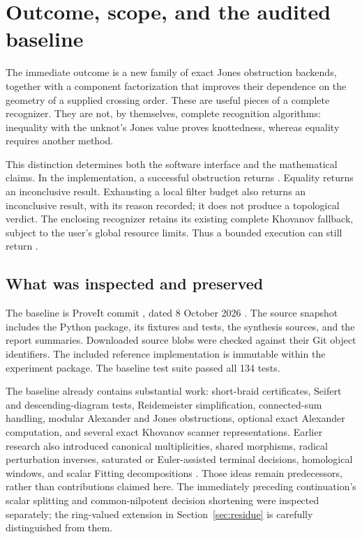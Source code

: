 \section{Outcome, scope, and the audited baseline}\label{sec:scope}

The immediate outcome is a new family of exact Jones obstruction backends,
together with a component factorization that improves their dependence on
the geometry of a supplied crossing order. These are useful pieces of a
complete recognizer. They are not, by themselves, complete recognition
algorithms: inequality with the unknot's Jones value proves knottedness,
whereas equality requires another method.

This distinction determines both the software interface and the mathematical
claims. In the implementation, a successful obstruction returns
. Equality returns an inconclusive result. Exhausting a local
filter budget also returns an inconclusive result, with its reason recorded;
it does not produce a topological verdict. The enclosing recognizer retains
its existing complete Khovanov fallback, subject to the user's global resource
limits. Thus a bounded execution can still return .

\subsection{What was inspected and preserved}

The baseline is ProveIt commit
, dated
8 October 2026 \cite{proveit2026}. The source snapshot includes the Python
 package, its fixtures and tests, the synthesis sources, and
the report summaries. Downloaded source blobs were checked against their
Git object identifiers. The included reference implementation is immutable
within the experiment package. The baseline test suite passed all 134 tests.

The baseline already contains substantial work: short-braid certificates,
Seifert and descending-diagram tests, Reidemeister simplification,
connected-sum handling, modular Alexander and Jones obstructions,
optional exact Alexander computation, and several exact Khovanov scanner
representations. Earlier research also introduced canonical multiplicities,
shared morphisms, radical perturbation inverses, saturated or Euler-assisted
terminal decisions, homological windows, and scalar Fitting decompositions
\cite{report07,report08,report09,report10,report11,report12}.
Those ideas remain predecessors, rather than contributions claimed here.
The immediately preceding continuation's scalar splitting and
common-nilpotent decision shortening were inspected separately; the
ring-valued extension in Section~\ref{sec:residue} is carefully distinguished
from them.

